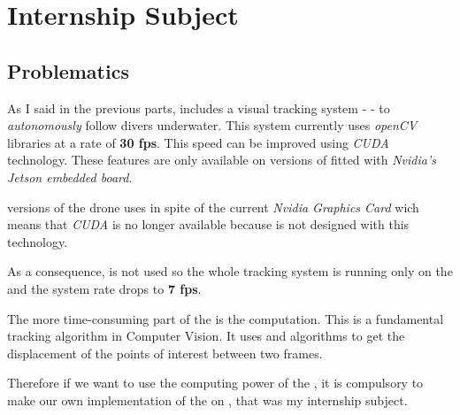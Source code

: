 
\chapter{Internship Subject} %

\label{Chapter3} %




\section{Problematics}

As I said in the previous parts, \iBubble{} includes a visual tracking system -  - to \emph{autonomously} follow divers underwater. This system currently uses \emph{openCV} libraries at a rate of \textbf{30 fps}. This speed can be improved using \emph{CUDA} technology. These features are only available on  versions of \iBubble{} fitted with \emph{Nvidia's Jetson embedded board}.

 versions of the drone uses \rasp{} in spite of the current \emph{Nvidia Graphics Card} wich means that \emph{CUDA} is no longer available because \vc{} is not designed with this technology.

As a consequence, \vc{} is not used so the whole tracking system is running only on the \cpu{} and the system rate drops to \textbf{7 fps}.

The more time-consuming part of the  is the \flow{} computation. This is a fundamental tracking algorithm in Computer Vision. It uses  and  algorithms to get the displacement of the points of interest between two frames.

Therefore if we want to use the computing power of the \vc{}, it is compulsory to make our own implementation of the \flow{} on \rasp, that was my internship subject.

